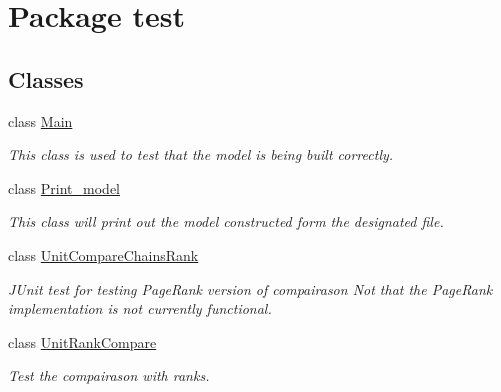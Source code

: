 \hypertarget{namespacetest}{}\section{Package test}
\label{namespacetest}
\subsection*{Classes}
\begin{DoxyCompactItemize}
\item 
class \hyperlink{classtest_1_1_main}{Main}
\begin{DoxyCompactList}\small\item\em This class is used to test that the model is being built correctly. \end{DoxyCompactList}\item 
class \hyperlink{classtest_1_1_print__model}{Print\+\_\+model}
\begin{DoxyCompactList}\small\item\em This class will print out the model constructed form the designated file. \end{DoxyCompactList}\item 
class \hyperlink{classtest_1_1_unit_compare_chains_rank}{Unit\+Compare\+Chains\+Rank}
\begin{DoxyCompactList}\small\item\em J\+Unit test for testing Page\+Rank version of compairason Not that the Page\+Rank implementation is not currently functional. \end{DoxyCompactList}\item 
class \hyperlink{classtest_1_1_unit_rank_compare}{Unit\+Rank\+Compare}
\begin{DoxyCompactList}\small\item\em Test the compairason with ranks. \end{DoxyCompactList}\end{DoxyCompactItemize}
